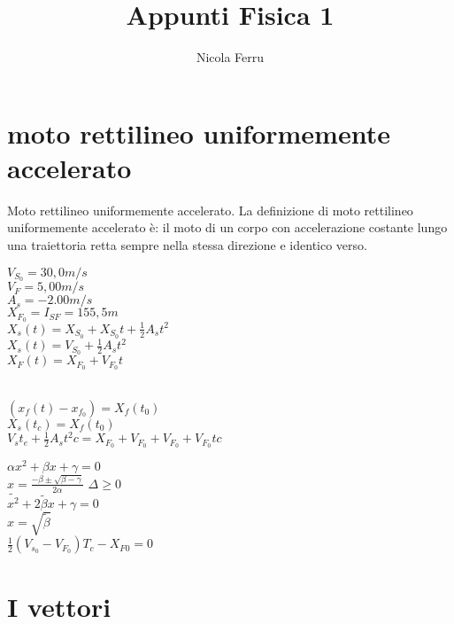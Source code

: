 \documentclass{book}
\title{Appunti Fisica 1}
\author{Nicola Ferru}
\date{}
\begin{document}
\maketitle
\section{moto rettilineo uniformemente accelerato}
Moto rettilineo uniformemente accelerato. La definizione di moto rettilineo uniformemente accelerato è: il moto di un corpo con accelerazione costante lungo una traiettoria retta sempre nella stessa direzione e identico verso.
\begin{multicols}{3} 
$V_{S_0}=30,0m/s$\\
$V_F=5,00m/s$\\
$A_s=-2.00m/s$\\
$X_{F_0}=I_{SF}=155,5m$\\
$X_s(t)=X_{S_0}+X_{S_0}t+\frac{1}{2}A_st^2$\\
$X_s(t)=V_{S_0}+\frac{1}{2}A_st^2$\\
$X_F(t)=X_{F_0}+V_{F_0}t$
\end{multicols}
\begin{multicols}{2} 
 \\
  $(x_f(t)-x_{f_0})=X_{f}(t_0)$\\
  $X_s(t_c)=X_f(t_0)$\\
  $V_st_e+\frac{1}{2}A_st^2c=X_{F_0}+V_{F_0}+V_{F_0}+V_{F_0}tc$
\end{multicols}
$\alpha{x^2}+\beta{x}+\gamma=0$\\
$x=\frac{-\beta\pm\sqrt{\beta-\gamma}}{2\alpha}$ $\Delta\geq 0$\\
$\tilde{x^2}+\tilde{2\beta x}+\gamma=0$\\
$x=\sqrt{\tilde{\beta}}$\\
$\frac{1}{2}(V_{s_0}-V_{F_0})T_c-X_{F0}=0$\\
\section{I vettori}
\end{document}
